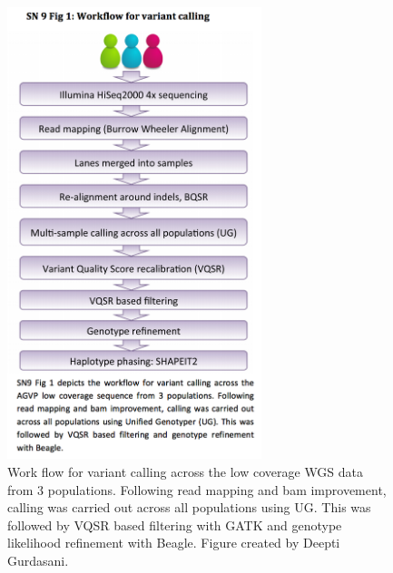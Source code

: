 \begin{figure}
\centering
\includegraphics[trim={0 4.25cm 0 0.75cm},clip,width=0.66\textwidth]{fig/SN09f1}
\caption[Variant calling flow diagram.]{Work flow for variant calling across the low coverage \gls{WGS} data from 3 populations. Following read mapping and bam improvement, calling was carried out across all populations using \gls{UG}. This was followed by \gls{VQSR} based filtering with \gls{GATK} and genotype likelihood refinement with Beagle. Figure created by Deepti Gurdasani.}
\label{fig:SN09f1}
\end{figure}